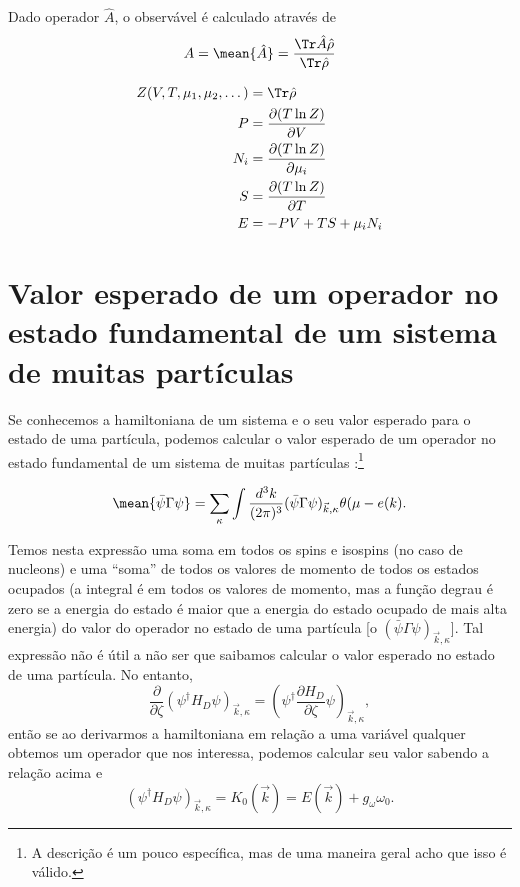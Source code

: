 Dado operador $\hat{A}$, o observável é calculado através de
\begin{equation}
	A = \mean{\hat{A}} = \frac{\Tr \hat{A}\hat{\rho}}{\Tr \hat{\rho}}
\end{equation}

\begin{align}
	Z(V, T, \mu_1, \mu_2, \dots) &= \Tr \hat{\rho} \\
	P &= \frac{\partial(T\ln Z)}{\partial V} \\
	N_i &= \frac{\partial (T \ln Z)}{\partial \mu_i} \\
	S &= \frac{\partial (T \ln Z)}{\partial T} \\
	E &= - PV + TS + \mu_i N_i
\end{align}

\section{Valor esperado de um operador no estado fundamental de um sistema de muitas partículas}

Se conhecemos a hamiltoniana de um sistema e o seu valor esperado para o estado de uma partícula, podemos calcular o valor esperado de um operador no estado fundamental de um sistema de muitas partículas \parencite{Glendenning}:\footnote{A descrição é um pouco específica, mas de uma maneira geral acho que isso é válido.}

\begin{equation}
	\mean{\bar\psi\Gamma\psi} = \sum_{\kappa} \int \frac{d^3k}{(2\pi)^3} (\bar\psi\Gamma\psi)_{\vec{k},\kappa} \theta(\mu - e(k).
\end{equation}

Temos nesta expressão uma soma em todos os spins e isospins (no caso de nucleons) e uma ``soma'' de todos os valores de momento de todos os estados ocupados (a integral é em todos os valores de momento, mas a função degrau é zero se a energia do estado é maior que a energia do estado ocupado de mais alta energia) do valor do operador no estado de uma partícula [o $(\bar\psi\Gamma\psi)_{\vec{k},\kappa}$]. Tal expressão não é útil a não ser que saibamos calcular o valor esperado no estado de uma partícula. No entanto,
\begin{equation}
	\frac{\partial}{\partial \zeta}(\psi^\dagger H_D\psi)_{\vec{k},\kappa} = (\psi^\dagger \frac{\partial H_D}{\partial \zeta} \psi)_{\vec{k},\kappa},
\end{equation}
%
então se ao derivarmos a hamiltoniana em relação a uma variável qualquer obtemos um operador que nos interessa, podemos calcular seu valor sabendo a relação acima e
\begin{equation}
	(\psi^\dagger H_D\psi)_{\vec{k},\kappa} = K_0(\vec{k}) = E(\vec{k}) + g_\omega \omega_0.
\end{equation}

